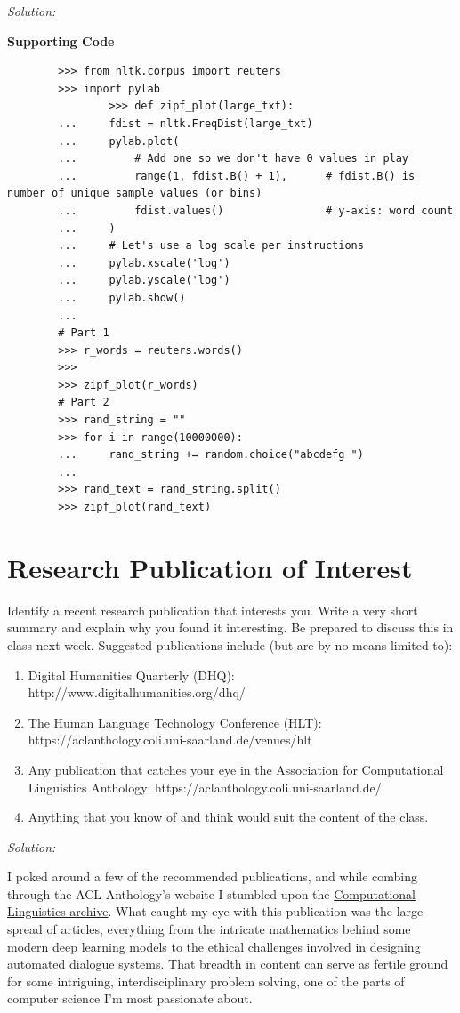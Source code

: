 \documentclass[11pt]{article}
\newenvironment{solution}{
	\vspace{10px}\noindent\emph{Solution:}
}{
	\vspace{10px}
}
\begin{document}
\begin{solution}
	\textbf{Supporting Code}
	\begin{lstlisting}
		>>> from nltk.corpus import reuters
		>>> import pylab
				>>> def zipf_plot(large_txt):
		...     fdist = nltk.FreqDist(large_txt)
		...     pylab.plot(
		...         # Add one so we don't have 0 values in play
		...         range(1, fdist.B() + 1),      # fdist.B() is number of unique sample values (or bins)
		...         fdist.values()                # y-axis: word count
		...     )
		...     # Let's use a log scale per instructions
		...     pylab.xscale('log')
		...     pylab.yscale('log')
		...     pylab.show()
		...
		# Part 1
		>>> r_words = reuters.words()
		>>>
		>>> zipf_plot(r_words)
		# Part 2
		>>> rand_string = ""
		>>> for i in range(10000000):
		...     rand_string += random.choice("abcdefg ")
		...
		>>> rand_text = rand_string.split()
		>>> zipf_plot(rand_text)
	\end{lstlisting}
	
\end{solution}  


\section*{Research Publication of Interest} Identify a recent research publication that interests you. Write a very short summary and explain why you found it interesting. Be prepared to discuss this in class next week. Suggested publications include (but are by no means limited to): 

\begin{enumerate}

	\item Digital Humanities Quarterly (DHQ): http://www.digitalhumanities.org/dhq/ 
	
	\item The Human Language Technology Conference (HLT): https://aclanthology.coli.uni-saarland.de/venues/hlt
	
	\item Any publication that catches your eye in the Association for Computational Linguistics Anthology: https://aclanthology.coli.uni-saarland.de/ 
	
	\item Anything that you know of and think would suit the content of the class.
	
\end{enumerate}

\begin{solution}
	
	I poked around a few of the recommended publications, and while combing through the ACL Anthology's website I stumbled upon the \href{https://www.mitpressjournals.org/loi/coli}{Computational Linguistics archive}. What caught my eye with this publication was the large spread of articles, everything from the intricate mathematics behind some modern deep learning models to the ethical challenges involved in designing automated dialogue systems. That breadth in content can serve as fertile ground for some intriguing, interdisciplinary problem solving, one of the parts of computer science I'm most passionate about. 
	
\end{solution}
\end{document}
